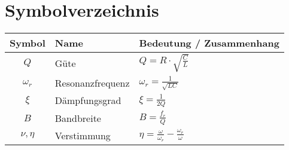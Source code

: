 \section{Symbolverzeichnis}
\begin{center}
\begin{tabular}{|c|l|l|}
	\hline
	\textbf{Symbol}	& \textbf{Name}		& \textbf{Bedeutung / Zusammenhang} \\
	\hline 
	$Q$				& Güte				& $Q = R \cdot \sqrt{\frac{C}{L}}$\\
	\hline
	$\omega_r$		& Resonanzfrequenz	& $\omega_r = \frac{1}{\sqrt{LC}}$ \\
	\hline
	$\xi$			& Dämpfungsgrad		& $\xi = \frac{1}{2Q}$ \\
	\hline
	$B$				& Bandbreite		& $B = \frac{f_r}{Q}$ \\
	\hline
	$\nu , \eta$	& Verstimmung		& $\eta = \frac{\omega}{\omega_r} - \frac{\omega_r}{\omega}$ \\
	\hline
\end{tabular}
\end{center}


